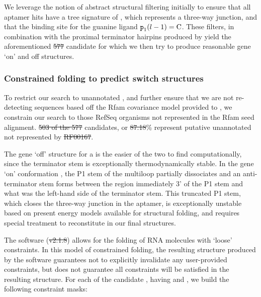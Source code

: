 \documentclass[11pt, oneside]{Thesis} %
\providecommand{\DIFadd}[1]{{\protect\color{blue}\uwave{#1}}} %
\providecommand{\DIFdel}[1]{{\protect\color{red}\sout{#1}}}                      %
\providecommand{\DIFaddbegin}{} %
\providecommand{\DIFaddend}{} %
\providecommand{\DIFdelbegin}{} %
\providecommand{\DIFdelend}{} %
\begin{document}
We leverage the notion of abstract structural filtering initially to ensure that
all \infernal aptamer hits have a tree signature of \ms{[0,1,2,2]}, which
represents a three-way junction, and that the binding site for the guanine ligand
${\text{\mbox{\tt p}}}_{\text{1}}(l - 1) = \text{C}$. These filters, in combination with the
proximal terminator hairpins produced by \tthp yield the aforementioned \DIFdelbegin \DIFdel{577
}\DIFdelend \DIFaddbegin \DIFadd{$577$
}\DIFaddend candidate \grbs for which we then try to produce reasonable gene `on' and off
structures.

\subsubsection{Constrained folding to predict switch structures}
\label{subsubsec:rfinder:consfold}

To restrict our search to unannotated \grbs, and further ensure that we are not
re-detecting sequences based off the Rfam covariance model provided to \infernal,
we constrain our search to those RefSeq organisms not represented in the Rfam seed
alignment. \DIFdelbegin \DIFdel{503 of the 577 }\DIFdelend \DIFaddbegin \DIFadd{$503$ of the $577$ }\DIFaddend candidates, or \DIFdelbegin \DIFdel{87.18}\DIFdelend \DIFaddbegin \DIFadd{$87.18$}\DIFaddend \% represent putative unannotated
\rbs not represented by \DIFdelbegin \DIFdel{RF00167}\DIFdelend \DIFaddbegin \DIFadd{RF$00167$}\DIFaddend .

The gene `off' structure \strOff for a \grb is the easier of the two to find
computationally, since the terminator stem is exceptionally thermodynamically
stable. In the gene `on' conformation \strOn, the P1 stem of the multiloop partially
dissociates and an anti-terminator stem forms between the region immediately 3' of
the P1 stem and what was the left-hand side of the terminator stem. This truncated
P1 stem, which closes the three-way junction in the aptamer, is exceptionally
unstable based on present energy models available for structural folding, and
requires special treatment to reconstitute in our final structures.

The software \rfold (\DIFdelbegin \DIFdel{v2.1.8}\DIFdelend \DIFaddbegin \DIFadd{v$2.1.8$}\DIFaddend ) allows for the folding of RNA molecules with `loose'
constraints. In this model of constrained folding, the resulting structure
produced by the software guarantees not to explicitly invalidate any user-provided
constraints, but does not guarantee all constraints will be satisfied in the
resulting structure. For each of the candidate \grbs, having \treeFor{\infernal}
and \treeFor{\tthp}, we build the following constraint masks:
\end{document}
